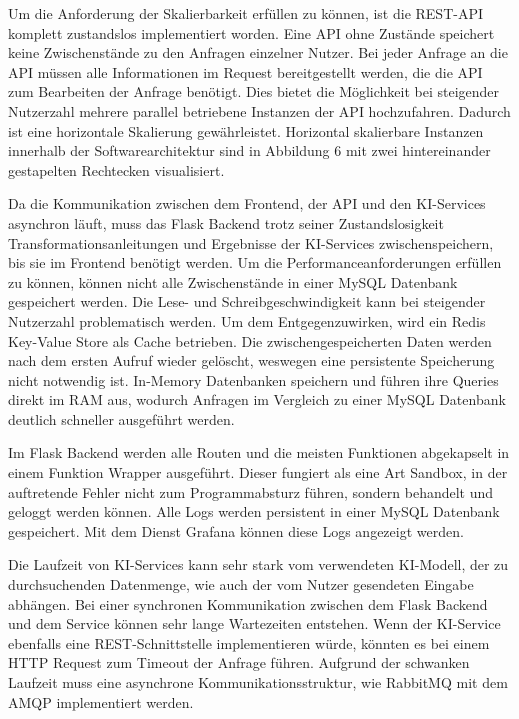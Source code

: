 Um die Anforderung der Skalierbarkeit erfüllen zu können, ist die REST-API komplett zustandslos implementiert worden. Eine API ohne Zustände speichert keine Zwischenstände zu den Anfragen einzelner Nutzer. Bei jeder Anfrage an die API müssen alle Informationen im Request bereitgestellt werden, die die API zum Bearbeiten der Anfrage benötigt. Dies bietet die Möglichkeit bei steigender Nutzerzahl mehrere parallel betriebene Instanzen der API hochzufahren. Dadurch ist eine horizontale Skalierung gewährleistet. Horizontal skalierbare Instanzen innerhalb der Softwarearchitektur sind in Abbildung 6 mit zwei hintereinander gestapelten Rechtecken visualisiert.

Da die Kommunikation zwischen dem Frontend, der API und den KI-Services asynchron läuft, muss das Flask Backend trotz seiner Zustandslosigkeit Transformationsanleitungen und Ergebnisse der KI-Services zwischenspeichern, bis sie im Frontend benötigt werden. Um die Performanceanforderungen erfüllen zu können, können nicht alle Zwischenstände in einer MySQL Datenbank gespeichert werden. Die Lese- und Schreibgeschwindigkeit kann bei steigender Nutzerzahl problematisch werden. Um dem Entgegenzuwirken, wird ein Redis Key-Value Store als Cache betrieben. Die zwischengespeicherten Daten werden nach dem ersten Aufruf wieder gelöscht, weswegen eine persistente Speicherung nicht notwendig ist. In-Memory Datenbanken speichern und führen ihre Queries direkt im RAM aus, wodurch Anfragen im Vergleich zu einer MySQL Datenbank deutlich schneller ausgeführt werden.

Im Flask Backend werden alle Routen und die meisten Funktionen abgekapselt in einem Funktion Wrapper ausgeführt. Dieser fungiert als eine Art Sandbox, in der auftretende Fehler nicht zum Programmabsturz führen, sondern behandelt und geloggt werden können. Alle Logs werden persistent in einer MySQL Datenbank gespeichert. Mit dem Dienst Grafana können diese Logs angezeigt werden.

Die Laufzeit von KI-Services kann sehr stark vom verwendeten KI-Modell, der zu durchsuchenden Datenmenge, wie auch der vom Nutzer gesendeten Eingabe abhängen. Bei einer synchronen Kommunikation zwischen dem Flask Backend und dem Service können sehr lange Wartezeiten entstehen. Wenn der KI-Service ebenfalls eine REST-Schnittstelle implementieren würde, könnten es bei einem HTTP Request zum Timeout der Anfrage führen. Aufgrund der schwanken Laufzeit muss eine asynchrone Kommunikationsstruktur, wie RabbitMQ mit dem AMQP implementiert werden.


